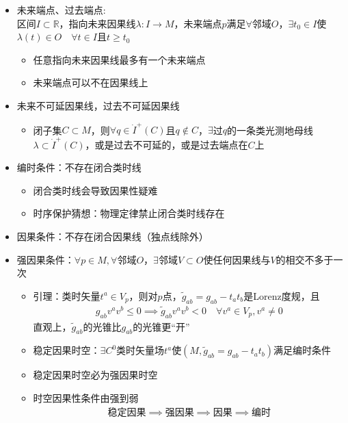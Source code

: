 \begin{itemize}
    \item 未来端点、过去端点:\\
    区间$I \subset \mathbb{R}$，指向未来因果线$\lambda: I \to M$，未来端点$p$满足$\forall$邻域$O$，$\exists t_0 \in I$使$\lambda(t) \in O \quad \forall t \in I$且$t \geq t_0$
    \begin{itemize}
        \item 任意指向未来因果线最多有一个未来端点
        \item 未来端点可以不在因果线上
    \end{itemize}
    \item 未来不可延因果线，过去不可延因果线
    \begin{itemize}
        \item 闭子集$C \subset M$，则$\forall q \in \dot{I}^+(C)$且$q \notin C$，$\exists$过$q$的一条类光测地母线$\lambda \subset \dot{I}^+(C)$，或是过去不可延的，或是过去端点在$C$上
    \end{itemize}
    \item 编时条件：不存在闭合类时线
    \begin{itemize}
        \item 闭合类时线会导致因果性疑难
        \item 时序保护猜想：物理定律禁止闭合类时线存在
    \end{itemize}
    \item 因果条件：不存在闭合因果线（独点线除外）
    \item 强因果条件：$\forall p \in M, \forall$邻域$O$，$\exists$邻域$V \subset O$使任何因果线与$V$的相交不多于一次
    \begin{itemize}
        \item 引理：类时矢量$t^a \in V_p$，则对$p$点，$\tilde{g}_{ab}=g_{ab}-t_a t_b$是Lorenz度规，且
        \begin{gather*}
            g_{ab} v^a v^b \leq 0 \implies \tilde{g}_{ab} v^a v^b < 0 \quad \forall v^a \in V_p, v^a \neq 0
        \end{gather*}
        直观上，$\tilde{g}_{ab}$的光锥比$g_{ab}$的光锥更“开”
        \item 稳定因果时空：$\exists C^0$类时矢量场$t^a$使$(M, \tilde{g}_{ab}=g_{ab}-t_a t_b)$满足编时条件
        \item 稳定因果时空必为强因果时空
        \item 时空因果性条件由强到弱
        \begin{gather*}
            \text{稳定因果} \implies \text{强因果} \implies \text{因果} \implies \text{编时}

\end{gather*}
\end{itemize}
\end{itemize}
